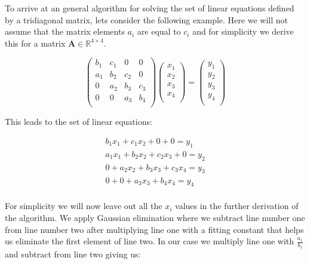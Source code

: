 \documentclass[12pt]{article}
\numberwithin{figure}{section}
\numberwithin{table}{section}
\begin{document}
\noindent To arrive at an general algorithm for solving the set of linear equations defined by a tridiagonal matrix, lets consider the following example. Here we will not assume that the matrix elements $a_i$ are equal to $c_i$ and for simplicity we derive this for a matrix $\mathbf{A}\in \mathbb{R}^{4\times4}$.

\[
    \begin{pmatrix}
                           b_1& c_1& 0 &0 \\
                           a_1 & b_2 & c_2 &0 \\
                           0& a_2 & b_3 & c_3 \\
                           0& 0& a_3 & b_4                         \\
                           
    \end{pmatrix}
    \begin{pmatrix}
    x_1 \\ 
    x_2 \\
    x_3 \\
    x_4 \\
    \end{pmatrix}
    =
    \begin{pmatrix}
    y_1 \\
    y_2 \\
    y_3\\
    y_4\\
    \end{pmatrix}
\] 

\noindent This leads to the set of linear equations:

\begin{align*}
b_1 x_1 + c_1 x_2 + 0 + 0 = y_1 \\
a_1 x_1 + b_2 x_2 + c_2 x_3 + 0 = y_2 \\
0 + a_2 x_2 + b_3 x_3 + c_3 x_4 = y_3 \\
0 + 0 + a_3 x_3 + b_4 x_4 = y_4\\
\end{align*}

\noindent For simplicity we will now leave out all the $x_i$ values in the further derivation of the algorithm. We apply Gaussian elimination where we subtract line number one from line number two after multiplying line one with a fitting constant that helps us eliminate the first element of line two. In our case we multiply line one with $\frac{a_1}{b_1}$ and subtract from line two giving us:
\end{document}
